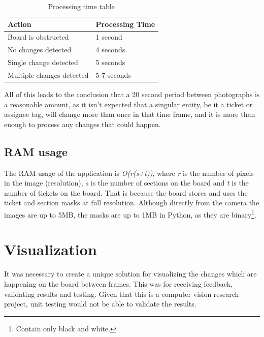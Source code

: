 \documentclass[12pt]{report}
\theoremstyle{definition}
\theoremstyle{remark}
\begin{document}
\begin{table}[h]
    \centering
    \begin{tabular}{|l|l|}
    \hline
    \textbf{Action}           & \textbf{Processing Time} \\ \hline \hline
    Board is obstructed       & 1 second                  \\ \hline
    No changes detected       & 4 seconds                 \\ \hline
    Single change detected    & 5 seconds                 \\ \hline
    Multiple changes detected & 5-7 seconds               \\ \hline
    \end{tabular}
    \caption{Processing time table}
    \label{tab:process}
\end{table}

All of this leads to the conclusion that a 20 second period between photographs is a reasonable amount, as it isn't expected that a singular entity, be it a ticket or assignee tag, will change more than once in that time frame, and it is more than enough to process any changes that could happen.
\subsection{RAM usage}
The RAM usage of the application is \textit{O(r(s+t))}, where \textit{r} is the number of pixels in the image (resolution), \textit{s} is the number of sections on the board and \textit{t} is the number of tickets on the board. That is because the board stores and uses the ticket and section masks at full resolution. Although directly from the camera the images are up to 5MB, the masks are up to 1MB in Python, as they are binary\footnote{Contain only black and white.}.

\section{Visualization}
It was necessary to create a unique solution for visualizing the changes which are happening on the board between frames. This was for receiving feedback, validating results and testing. Given that this is a computer vision research project, unit testing would not be able to validate the results.
\end{document}
